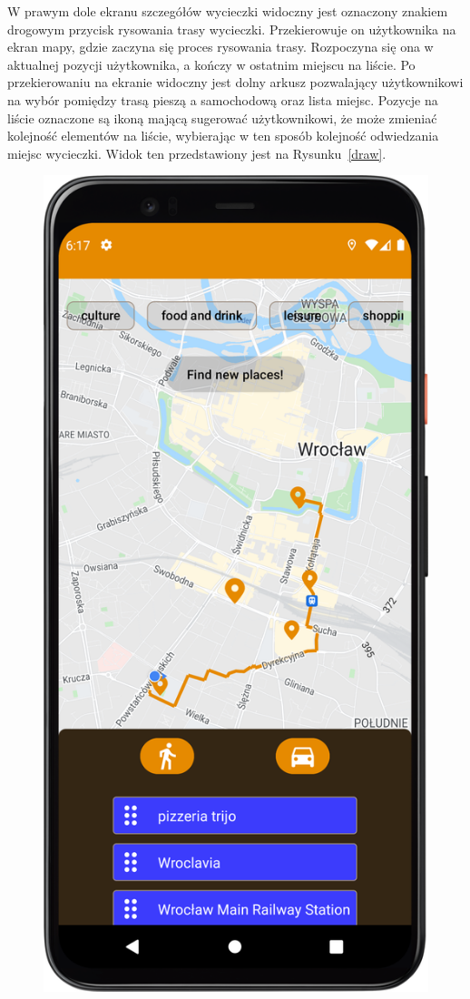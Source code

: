         W prawym dole ekranu szczegółów wycieczki widoczny jest oznaczony znakiem drogowym przycisk rysowania trasy wycieczki. Przekierowuje on użytkownika na ekran mapy, gdzie zaczyna się proces 
        rysowania trasy. Rozpoczyna się ona w aktualnej pozycji użytkownika, a kończy w ostatnim miejscu na liście. Po przekierowaniu na ekranie widoczny jest dolny arkusz pozwalający użytkownikowi
        na wybór pomiędzy trasą pieszą a samochodową oraz lista miejsc. Pozycje na liście oznaczone są ikoną mającą sugerować użytkownikowi, że może zmieniać kolejność elementów na liście,
        wybierając w ten sposób kolejność odwiedzania miejsc wycieczki. Widok ten przedstawiony jest na Rysunku~\ref{draw}.

        \begin{figure}[H]
            \centering
            \includegraphics[scale=0.10]{src/app/drawing_trip.png}

\end{figure}
